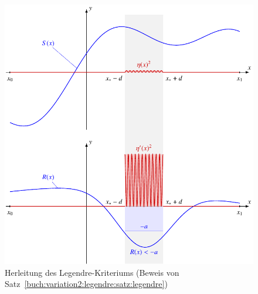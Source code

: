 %
%
%
\begin{figure}
\centering
\includegraphics{chapters/060-variation2/images/legendre.pdf}
\caption{Herleitung des Legendre-Kriteriums (Beweis von Satz~\ref{buch:variation2:legendre:satz:legendre})
\label{buch:variation2:legendre:fig:legendre}}
\end{figure}
